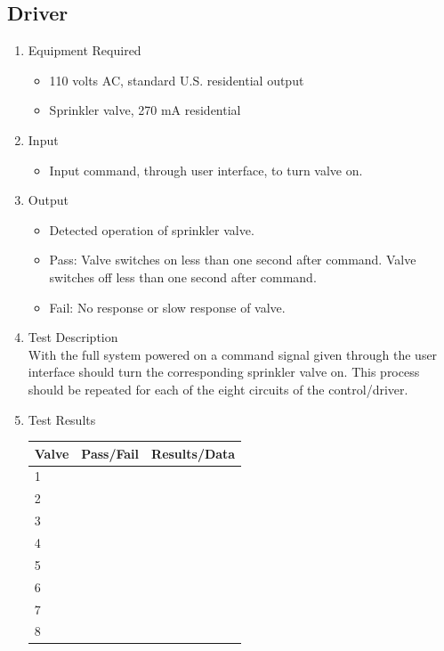 \documentclass{article}
\begin{document}
\subsection{Driver}

\begin{enumerate}
\item Equipment Required
	\begin{itemize}
	\item 110 volts AC, standard U.S. residential output
	\item Sprinkler valve, 270 mA residential
	\end{itemize}
\item Input
	\begin{itemize}
	\item Input command, through user interface, to turn valve on.
	\end{itemize}
\item Output
	\begin{itemize}
	\item Detected operation of sprinkler valve.
	\item Pass: Valve switches on less than one second after command.
		Valve switches off less than one second after command.
	\item Fail: No response or slow response of valve.
	\end{itemize}
\item Test Description \\

With the full system powered on a command signal
given through the user interface should turn
the corresponding sprinkler valve on.
This process should be repeated for each of the
eight circuits of the control/driver.

\item Test Results \\
	\vspace{0.2in}
	\begin{tabular}{|l|l|l|}
		\hline
		Valve & Pass/Fail & Results/Data\hspace{2in} \\
		\hline
		1 && \\
		\hline
		2 && \\
		\hline
		3 && \\
		\hline
		4 && \\
		\hline
		5 && \\
		\hline
		6 && \\
		\hline
		7 && \\
		\hline
		8 && \\
		\hline
	\end{tabular}
\end{enumerate}
\end{document}
